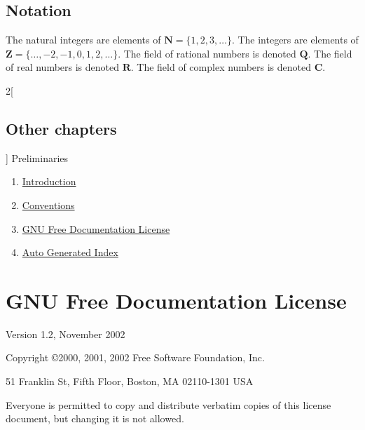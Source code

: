 \documentclass{stacks-project-book}
\theoremstyle{plain}
\theoremstyle{definition}
\theoremstyle{remark}
\numberwithin{equation}{subsection}
\begin{document}
\section{Notation}
\label{conventions-section-notation}

\noindent
The natural integers are elements of $\mathbf{N} = \{1, 2, 3, \ldots\}$.
The integers are elements of $\mathbf{Z} = \{\ldots, -2, -1, 0, 1, 2, \ldots\}$.
The field of rational numbers is denoted $\mathbf{Q}$.
The field of real numbers is denoted $\mathbf{R}$.
The field of complex numbers is denoted $\mathbf{C}$.



\begin{multicols}{2}[\section{Other chapters}]
\noindent
Preliminaries
\begin{enumerate}
\item \hyperref[introduction-section-phantom]{Introduction}
\item \hyperref[conventions-section-phantom]{Conventions}
\item \hyperref[fdl-section-phantom]{GNU Free Documentation License}
\item \hyperref[index-section-phantom]{Auto Generated Index}
\end{enumerate}
\end{multicols}

%

\chapter{GNU Free Documentation License}

\label{fdl-section-phantom}

\begin{center}

      Version 1.2, November 2002


Copyright \copyright 2000, 2001, 2002  Free Software Foundation, Inc.

\bigskip

    51 Franklin St, Fifth Floor, Boston, MA  02110-1301  USA

\bigskip

Everyone is permitted to copy and distribute verbatim copies
of this license document, but changing it is not allowed.
\end{center}
\end{document}
